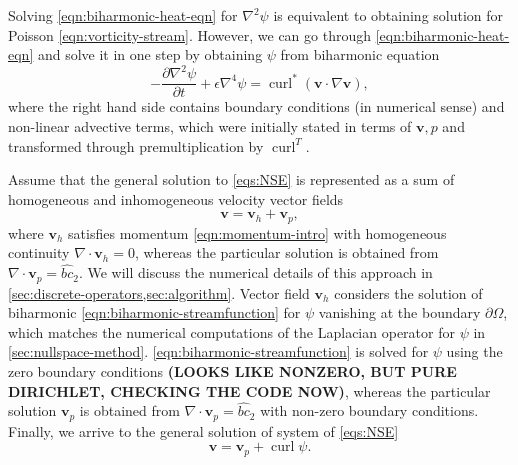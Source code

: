 \documentclass{article}
\numberwithin{equation}{section}
\begin{document}
	
	Solving \cref{eqn:biharmonic-heat-eqn} for $\nabla^2\psi$ is equivalent to obtaining solution for Poisson \cref{eqn:vorticity-stream}. However, we can go through \cref{eqn:biharmonic-heat-eqn} and solve it in one step by obtaining $\psi$ from biharmonic equation
	\begin{equation}
	\label{eqn:biharmonic-streamfunction}
		\boxed{
		-\frac{\partial\nabla ^2 \psi}{\partial t} 
		+\epsilon\nabla ^4 \psi=\operatorname{curl}^*\left( \boldsymbol{v}\cdot\nabla\boldsymbol{v}\right),
		}
	\end{equation}
where the right hand side contains boundary conditions (in numerical sense) and non-linear advective terms, which were initially stated in terms of $\boldsymbol{v},p$ and transformed through premultiplication by $\operatorname{curl}^T$. 

Assume that the general solution to \cref{eqs:NSE} is represented as a sum of homogeneous and inhomogeneous velocity vector fields
\begin{equation}
	\boldsymbol{v}=\boldsymbol{v}_h+\boldsymbol{v}_p,
\end{equation}
where $\boldsymbol{v}_h$ satisfies momentum \cref{eqn:momentum-intro} with homogeneous continuity $\nabla\cdot \boldsymbol{v}_h=0$, whereas the particular solution is obtained from $\nabla\cdot\boldsymbol{v}_p=\hat{{bc}}_2$. 
We will discuss the numerical details of this approach in \cref{sec:discrete-operators,sec:algorithm}.
	Vector field $\boldsymbol{v}_h$ considers the solution of biharmonic \cref{eqn:biharmonic-streamfunction} for $\psi$ vanishing at the boundary $\partial \Omega$, which matches the numerical computations of the Laplacian operator for $\psi$ in \cref{sec:nullspace-method}.
	\cref{eqn:biharmonic-streamfunction} is solved for $\psi$ using the zero boundary conditions \textbf{(LOOKS LIKE NONZERO, BUT PURE DIRICHLET, CHECKING THE CODE NOW)}, whereas the particular solution $\boldsymbol{v}_p$ is obtained from  $\nabla\cdot\boldsymbol{v}_p=\hat{{bc}}_2$ with non-zero boundary conditions. Finally, we arrive to the general solution of system of \cref{eqs:NSE} 
	\begin{equation}
		\boxed{\boldsymbol{v}=\boldsymbol{v}_p+\operatorname{curl}\psi.}
	\end{equation}
\end{document}
